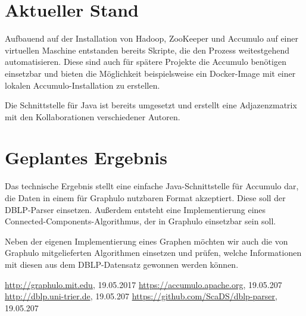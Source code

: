 \documentclass{article}
\begin{document}
\section{Aktueller Stand}

Aufbauend auf der Installation von Hadoop, ZooKeeper und Accumulo auf einer virtuellen Maschine entstanden bereits Skripte, die den Prozess weitestgehend automatisieren. Diese sind auch für spätere Projekte die Accumulo benötigen einsetzbar und bieten die Möglichkeit beispielsweise ein Docker-Image mit einer lokalen Accumulo-Installation zu erstellen.

Die Schnittstelle für Java ist bereits umgesetzt und erstellt eine Adjazenzmatrix mit den Kollaborationen verschiedener Autoren.


\section{Geplantes Ergebnis}


Das technische Ergebnis stellt eine einfache Java-Schnittstelle für Accumulo dar, die Daten in einem für Graphulo nutzbaren Format akzeptiert. Diese soll der DBLP-Parser einsetzen. Außerdem entsteht eine Implementierung eines Connected-Components-Algorithmus, der in Graphulo einsetzbar sein soll.

Neben der eigenen Implementierung eines Graphen möchten wir auch die von Graphulo mitgelieferten Algorithmen einsetzen und prüfen, welche Informationen mit diesen aus dem DBLP-Datensatz gewonnen werden können.


\begin{thebibliography}{laengste Labelbreite}
	 \url{http://graphulo.mit.edu}, 19.05.2017
	 \url{https://accumulo.apache.org}, 19.05.207
	 \url{http://dblp.uni-trier.de}, 19.05.207
	 \url{https://github.com/ScaDS/dblp-parser}, 19.05.207
\end{thebibliography}
\end{document}
